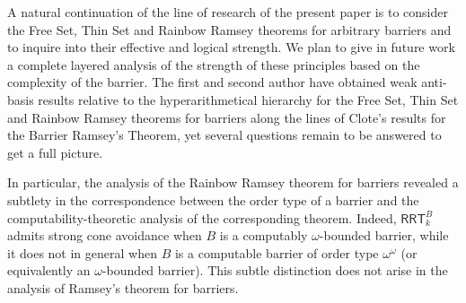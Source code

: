 \documentclass{article}
\newcommand{\RRT}[0]{\mathsf{RRT}}
\def\qt#1{``#1''}%
\numberwithin{theorem}{section}
\newtheorem{question}[theorem]{Question}
\newcommand{\ludovic}[1]{\textcolor{blue}{#1}}
\newcommand{\lorenzo}[1]{\textcolor{orange}{#1}}
\begin{document}




A natural continuation of the line of research of the present paper is to consider the Free Set, Thin Set and Rainbow Ramsey theorems for arbitrary barriers and to inquire into their effective and logical strength. We plan to give in future work a complete layered analysis of the strength of these principles based on the complexity of the barrier. The first and second author have obtained weak anti-basis results relative to the hyperarithmetical hierarchy for the Free Set, Thin Set and Rainbow Ramsey theorems for barriers along the lines of Clote's \cite{clote1984recursion} results for the Barrier Ramsey's Theorem, yet several questions remain to be answered to get a full picture.

In particular, the analysis of the Rainbow Ramsey theorem for barriers revealed a subtlety in the correspondence between the order type of a barrier and the computability-theoretic analysis of the corresponding theorem. Indeed, $\RRT^B_k$ admits strong cone avoidance when $B$ is a computably $\omega$-bounded barrier, while it does not in general when $B$ is a computable barrier of order type $\omega^\omega$ (or equivalently an $\omega$-bounded barrier). This subtle distinction does not arise in the analysis of Ramsey's theorem for barriers. 
\end{document}
